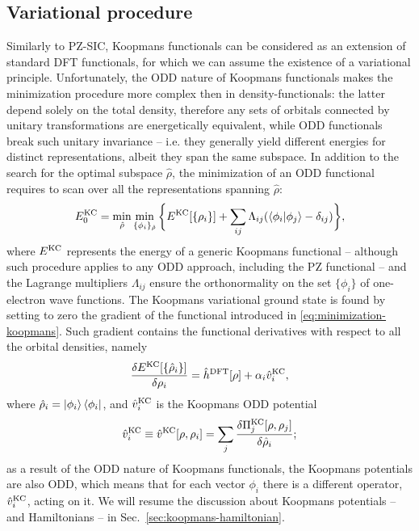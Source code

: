 \subsection{Variational procedure\label{sec:variational-procedure}}
Similarly to PZ-SIC, Koopmans functionals can be considered as an extension of standard DFT functionals, for which we can assume the existence of a variational principle. Unfortunately, the ODD nature of Koopmans functionals makes the minimization procedure more complex then in density-functionals: the latter depend solely on the total density, therefore any sets of orbitals connected by unitary transformations are energetically equivalent, while ODD functionals break such unitary invariance -- i.e. they generally yield different energies for distinct representations, albeit they span the same subspace. In addition to the search for the optimal subspace $\hat{\rho}$, the minimization of an ODD functional requires to scan over all the representations spanning $\hat{\rho}$:
%
\begin{equation}
    E^{\rm KC}_0 = \min_{\hat{\rho}} \min_{\{ \phi_i \}_{\hat{\rho}}} \bigg\{ E^{\rm KC}[\{ \rho_i \}] + \sum_{ij} \Lambda_{ij} (\braket{\phi_i|\phi_j} - \delta_{ij}) \bigg\} ,
    \label{eq:minimization-koopmans}
\end{equation}
%
where $E^{\rm KC}$ represents the energy of a generic Koopmans functional -- although such procedure applies to any ODD approach, including the PZ functional -- and the Lagrange multipliers $\Lambda_{ij}$ ensure the orthonormality on the set $\{ \phi_i \}$ of one-electron wave functions. The Koopmans variational ground state is found by setting to zero the gradient of the functional introduced in \cref{eq:minimization-koopmans}. Such gradient contains the functional derivatives with respect to all the orbital densities, namely
%
\begin{equation}
    \frac{\delta E^{\rm KC}[\{ \hat{\rho}_i \}]}{\delta \rho_i} = \hat{h}^{\rm DFT}[\rho] + \alpha_i \hat{v}^{\rm KC}_i ,
    \label{eq:koopmans-functional-derivative}
\end{equation}
%
where $\hat{\rho}_i = \ket{\phi_i} \bra{\phi_i}$, and $\hat{v}_i^{\rm KC}$ is the Koopmans ODD potential
%
\begin{equation}
    \hat{v}^{\rm KC}_i \equiv \hat{v}^{\rm KC}[\rho,\rho_i] = \sum_j \frac{\delta \Pi_j^{\rm KC}[\rho,\rho_j]}{\delta \hat{\rho}_i} ;
    \label{eq:koopmans-ith-potential}
\end{equation}
%
as a result of the ODD nature of Koopmans functionals, the Koopmans potentials are also ODD, which means that for each vector $\phi_i$ there is a different operator, $\hat{v}_i^{\rm KC}$, acting on it. We will resume the discussion about Koopmans potentials -- and Hamiltonians -- in Sec.~\ref{sec:koopmans-hamiltonian}.

